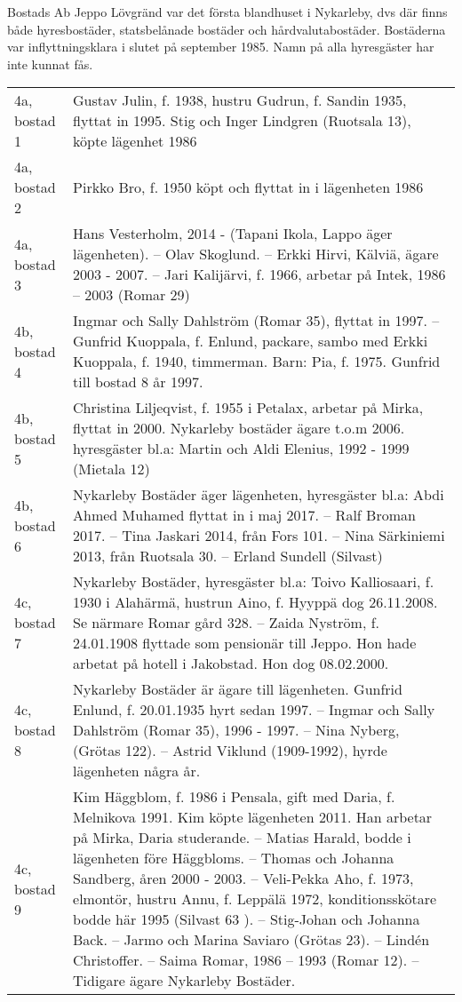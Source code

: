 Bostads Ab Jeppo Lövgränd var det första blandhuset i Nykarleby, dvs där finns både hyresbostäder, statsbelånade bostäder och hårdvalutabostäder. Bostäderna var inflyttningsklara i slutet på september 1985. Namn på alla hyresgäster har inte kunnat fås.
\begin{center}
  \begin{tabular}{l l}
    \hline
    4a, bostad 1 & Gustav Julin, f. 1938, hustru Gudrun, f. Sandin 1935, flyttat in 1995. Stig och Inger Lindgren (Ruotsala 13), köpte lägenhet 1986 \\
    4a, bostad 2 & Pirkko Bro, f. 1950 köpt och flyttat in i lägenheten 1986 \\
    4a, bostad 3 & Hans Vesterholm,  2014  - (Tapani Ikola, Lappo äger lägenheten). -- Olav Skoglund. --	Erkki Hirvi, Kälviä, ägare 2003 - 2007. --	Jari Kalijärvi, f. 1966, arbetar på Intek, 1986 – 2003 (Romar 29) \\
    4b, bostad 4 & Ingmar och Sally Dahlström (Romar 35), flyttat in 1997. -- Gunfrid Kuoppala, f. Enlund, packare, sambo med Erkki Kuoppala, f. 1940, timmerman. Barn: Pia, f. 1975. Gunfrid till bostad 8 år 1997. \\
    4b, bostad 5 & Christina Liljeqvist, f. 1955 i Petalax, arbetar på Mirka, flyttat in 2000. Nykarleby bostäder ägare t.o.m 2006. hyresgäster bl.a: Martin och Aldi Elenius, 1992 - 1999 (Mietala 12) \\
    4b, bostad 6 & Nykarleby Bostäder äger lägenheten, hyresgäster bl.a: Abdi Ahmed Muhamed flyttat in i maj 2017. -- Ralf Broman 2017. -- Tina Jaskari 2014, från Fors 101. -- Nina Särkiniemi 2013, från Ruotsala 30. -- Erland Sundell (Silvast) \\
    4c, bostad 7 & Nykarleby Bostäder, hyresgäster bl.a: Toivo Kalliosaari, f. 1930 i Alahärmä, hustrun Aino, f. Hyyppä dog 26.11.2008. Se närmare Romar gård 328. -- Zaida Nyström, f. 24.01.1908 flyttade som pensionär till Jeppo. Hon hade arbetat på hotell i Jakobstad. Hon dog 08.02.2000. \\
    4c, bostad 8 & Nykarleby Bostäder är ägare till lägenheten. Gunfrid Enlund, f. 20.01.1935 hyrt sedan 1997. -- Ingmar och Sally Dahlström (Romar 35), 1996 - 1997. -- Nina Nyberg, (Grötas 122).	-- Astrid Viklund (1909-1992), hyrde lägenheten några år. \\
    4c, bostad 9 & Kim Häggblom, f. 1986 i Pensala, gift med Daria, f. Melnikova 1991. Kim köpte lägenheten  2011. Han arbetar på Mirka, Daria studerande. -- Matias Harald, bodde i lägenheten före Häggbloms. -- Thomas och Johanna Sandberg, åren 2000 - 2003.	-- Veli-Pekka Aho, f. 1973, elmontör, hustru Annu, f. Leppälä 1972, konditionsskötare bodde här 1995  (Silvast 63 ). -- Stig-Johan och Johanna Back. -- Jarmo och Marina Saviaro (Grötas 23). -- Lindén Christoffer. -- Saima Romar,  1986 – 1993 (Romar 12). -- Tidigare ägare  Nykarleby Bostäder. \\
    \hline
  \end{tabular}
\end{center}



